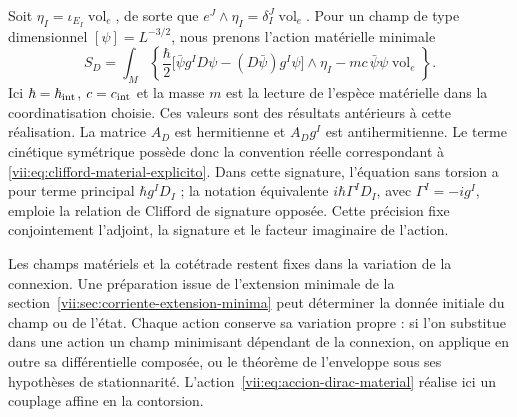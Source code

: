 Soit \(\eta_I=\iota_{E_I}\operatorname{vol}_e\), de sorte que \(e^J\wedge\eta_I=\delta_I^J\operatorname{vol}_e\). Pour un champ de type dimensionnel \([\psi]=L^{-3/2}\), nous prenons l'action matérielle minimale
\begin{equation}
 S_D=\int_M\left\{
 \frac{\hbar}{2}
 \bigl[\bar\psi g^I D\psi-(D\bar\psi)g^I\psi\bigr]\wedge\eta_I
 -mc\,\bar\psi\psi\operatorname{vol}_e\right\}.
 \label{vii:eq:accion-dirac-material}
\end{equation}
Ici \(\hbar=\hbar_{\rm int}\), \(c=c_{\rm int}\) et la masse \(m\) est la lecture de l'espèce matérielle dans la coordinatisation choisie. Ces valeurs sont des résultats antérieurs à cette réalisation. La matrice \(A_D\) est hermitienne et \(A_Dg^I\) est antihermitienne. Le terme cinétique symétrique possède donc la convention réelle correspondant à \eqref{vii:eq:clifford-material-explicito}. Dans cette signature, l'équation sans torsion a pour terme principal \(\hbar g^I D_I\) ; la notation équivalente \(i\hbar\Gamma^I D_I\), avec \(\Gamma^I=-i g^I\), emploie la relation de Clifford de signature opposée. Cette précision fixe conjointement l'adjoint, la signature et le facteur imaginaire de l'action.

Les champs matériels et la cotétrade restent fixes dans la variation
de la connexion. Une préparation issue de l'extension minimale de
la section~\ref{vii:sec:corriente-extension-minima} peut déterminer
la donnée initiale du champ ou de l'état. Chaque action conserve sa
variation propre : si l'on substitue dans une action un champ minimisant
dépendant de la connexion, on applique en outre sa différentielle composée,
ou le théorème de l'enveloppe sous ses hypothèses de stationnarité.
L'action~\eqref{vii:eq:accion-dirac-material} réalise ici un
couplage affine en la contorsion.

